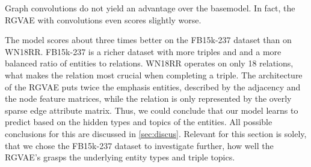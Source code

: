 
Graph convolutions do not yield an advantage over the basemodel. In fact, the RGVAE with convolutions even scores slightly worse. 

The model scores about three times better on the FB15k-237 dataset than on WN18RR. FB15k-237 is a richer dataset with more triples and and a more balanced ratio of entities to relations. WN18RR operates on only 18 relations, what makes the relation most crucial when completing a triple. The architecture of the RGVAE puts twice the emphasis entities, described by the adjacency and the node feature matrices, while the relation is only represented by the overly sparse edge attribute matrix. Thus, we could conclude that our model learns to predict based on the hidden types and topics of the entities. All possible conclusions for this are discussed in \ref{sec:discus}. Relevant for this section is solely, that we chose the FB15k-237 dataset to investigate further, how well the RGVAE's grasps the underlying entity types and triple topics.   



